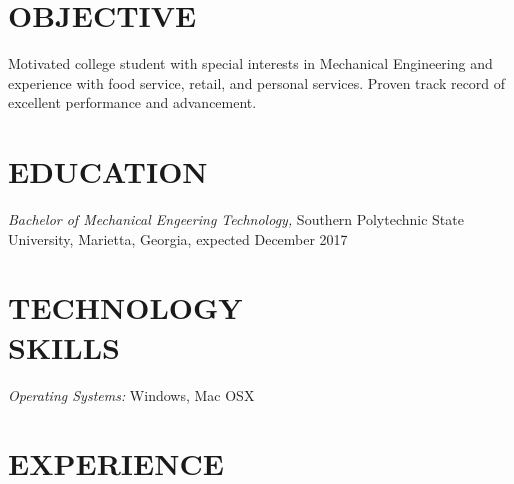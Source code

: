 \documentclass[margin, 10pt]{res} %
\begin{document}
\begin{resume}

 
\section{OBJECTIVE}  

Motivated college student with special interests in Mechanical Engineering and experience with food service, retail, and personal services. Proven track record of excellent performance and advancement.


\section{EDUCATION}

{\sl Bachelor of Mechanical Engeering Technology,} Southern Polytechnic State University, Marietta, Georgia, expected December 2017 \\

 

\section{TECHNOLOGY \\ SKILLS} 

{\sl Operating Systems:} 
Windows, Mac OSX \\

 
 
\section{EXPERIENCE}


\end{resume}
\end{document}
